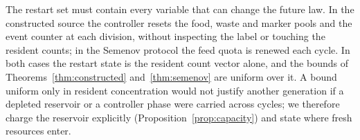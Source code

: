 \begin{remark}
The restart set must contain every variable that can change the future law. In the constructed source the controller resets the food, waste and marker pools and the event counter at each division, without inspecting the label or touching the resident counts; in the Semenov protocol the feed quota is renewed each cycle. In both cases the restart state is the resident count vector alone, and the bounds of Theorems~\ref{thm:constructed} and~\ref{thm:semenov} are uniform over it. A bound uniform only in resident concentration would not justify another generation if a depleted reservoir or a controller phase were carried across cycles; we therefore charge the reservoir explicitly (Proposition~\ref{prop:capacity}) and state where fresh resources enter.
\end{remark}
